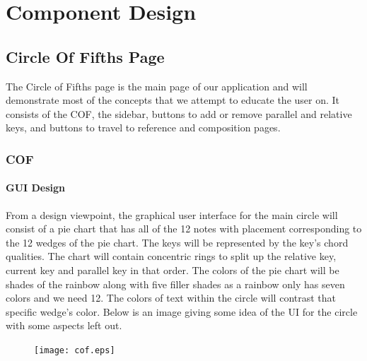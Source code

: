 \documentclass[onecolumn, draftclsnofoot,10pt, compsoc]{IEEEtran}
\begin{document}
\section{Component Design}
\subsection{Circle Of Fifths Page}
The Circle of Fifths page is the main page of our application and will demonstrate most of the concepts that we attempt to educate the user on.
It consists of the COF, the sidebar, buttons to add or remove parallel and relative keys, and buttons to travel to reference and composition pages.

\subsubsection{COF}

\setcounter{secnumdepth}{4}
\paragraph{GUI Design}
From a design viewpoint, the graphical user interface for the main circle will consist of a pie chart that has all of the 12 notes with placement corresponding to the 12 wedges of the pie chart.
The keys will be represented by the key’s chord qualities.
The chart will contain concentric rings to split up the relative key, current key and parallel key in that order.
The colors of the pie chart will be shades of the rainbow along with five filler shades as a rainbow only has seven colors and we need 12.
The colors of text within the circle will contrast that specific wedge’s color.
Below is an image giving some idea of the UI for the circle with some aspects left out.

\begin{figure}[H]
    \centering
    \texttt{[image: cof.eps]}
\end{figure}
\end{document}
